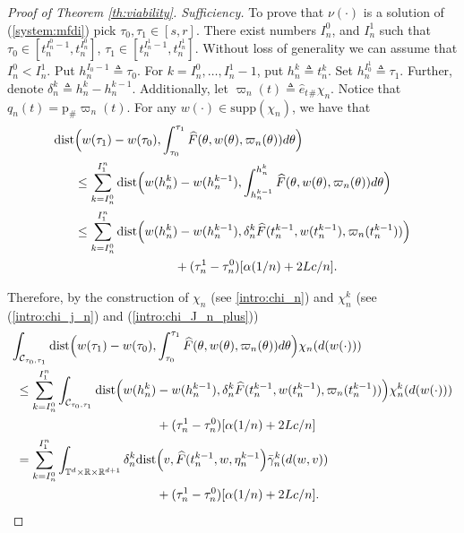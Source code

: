 \documentclass[a4paper,12pt]{article}
\newcommand{\rdp}{\mathbb{R}^{d+1}}
\newcommand{\tdr}{\mathbb{T}^{d}\times\mathbb{R}}
\newcommand{\intc}[2]{\int_{\mathcal{C}_{#1,#2}}}
\begin{document}
\begin{proof}[Proof of Theorem \ref{th:viability}. Sufficiency]
	To prove that $\nu(\cdot)$ is a solution of (\ref{system:mfdi}) pick $\tau_0,\tau_1\in [s,r]$. There exist numbers $I_n^0$, and $I_n^1$ such that $\tau_0\in [t_n^{I^0_n-1},t_n^{I_n^0}]$, $\tau_1\in [t_n^{I^1_n-1},t_n^{I_n^1}]$. Without loss of generality we can assume that $I_n^0<I_n^1$. Put $h_n^{I_0-1}\triangleq \tau_0$. For $k=I_n^0,\ldots,I_n^1-1$, put $h_n^k\triangleq t_n^k$. Set $h_n^{I_0^1}\triangleq \tau_1$. Further, denote $\delta_n^k\triangleq h_n^k-h_{n}^{k-1}$. Additionally, let $\varpi_n(t)\triangleq \hat{e}_t{}_\#\chi_n$. Notice that $q_n(t)=\mathrm{p}_\#\varpi_n(t)$. For any $w(\cdot)\in\mathrm{supp}(\chi_n)$, we have that
	\begin{equation*}
	\begin{split}
	\mathrm{dist}&\Bigl(w(\tau_1)-w(\tau_0),\int_{\tau_0}^{\tau_1}\widehat{F}(\theta,w(\theta),\varpi_n(\theta))d\theta \Bigr)\\&\leq
	\sum_{k=I_n^0}^{I_1^n}\mathrm{dist}\Bigl(w(h_n^k)-w(h_n^{k-1}), \int_{h_n^{k-1}}^{h_n^{k}}\widehat{F}(\theta,w(\theta),\varpi_n(\theta))d\theta \Bigr)\\ 
	&\leq
	\sum_{k=I_n^0}^{I_1^n}\mathrm{dist}\Bigl(w(h_n^k)-w(h_n^{k-1}), \delta_n^{k}\widehat{F}(t_n^{k-1},w(t_n^{k-1}),\varpi_n(t_n^{k-1}))\Bigr)
	\\&{}\hspace{80pt}+(\tau_n^1-\tau_n^0)[\alpha(1/n)+2Lc/n].
	\end{split}
	\end{equation*} 
	
	Therefore, by the construction of $\chi_n$ (see \ref{intro:chi_n}) and $\chi_n^k$ (see (\ref{intro:chi_j_n}) and (\ref{intro:chi_J_n_plus}))
	\begin{equation*}
	\begin{split}
	\intc{\tau_0}{\tau_1}\mathrm{dist}\Bigl(w(\tau_1)-w(\tau_0), &\int_{\tau_0}^{\tau_1}\widehat{F}(\theta,w(\theta),\varpi_n(\theta))d\theta \Bigr)\chi_n(d(w(\cdot)))\\ \leq
	\sum_{k=I_n^0}^{I_1^n}\intc{\tau_0}{\tau_1}\mathrm{dist}\Bigl(w(h_n^k)&-w(h_n^{k-1}), \delta_n^{k}\widehat{F}(t_n^{k-1},w(t_n^{k-1}),\varpi_n(t_n^{k-1}))\Bigr)\chi_n^k(d(w(\cdot)))\\ 
	&+(\tau_n^1-\tau_n^0)[\alpha(1/n)+2Lc/n]\\ = 
	\sum_{k=I_n^0}^{I_1^n}\int_{\tdr\times\rdp} \delta_n^{k}\mathrm{dist}&\Bigl(v, \widehat{F}(t_n^{k-1},w,\eta_n^{k-1}\Bigr)\bar{\gamma}_n^k(d(w,v))
	\\&+(\tau_n^1-\tau_n^0)[\alpha(1/n)+2Lc/n].
	\end{split}
	\end{equation*} 
	

\end{proof}
\end{document}
